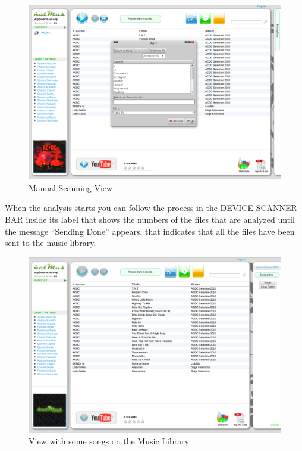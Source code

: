 \begin{figure}[htbp]
  \centering
  \includegraphics[width=15cm]{img/MU/scan_manual.png}
\caption{Manual Scanning View}
\end{figure}

When the analysis starts you can follow the process in the DEVICE SCANNER BAR
inside its label that shows the numbers of the files that are analyzed until
the message ``Sending Done'' appears, that indicates that all the files have
been sent to the music library.\\

\begin{figure}[htbp]
  \centering
  \includegraphics[width=15cm]{img/MU/song_loaded.png}
\caption{View with some songs on the Music Library}
\end{figure}

